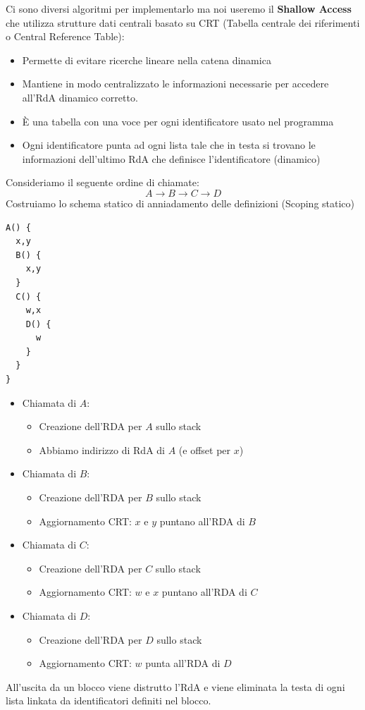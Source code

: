 \documentclass[a4paper]{article}
\begin{document}
Ci sono diversi algoritmi per implementarlo ma noi useremo
il \textbf{Shallow Access} che utilizza strutture dati centrali basato su CRT 
(Tabella centrale dei riferimenti o Central Reference Table):
\begin{itemize}
  \item Permette di evitare ricerche lineare nella catena dinamica
  \item Mantiene in modo centralizzato le informazioni necessarie per 
  accedere all'RdA dinamico corretto.
  \item È una tabella con una voce per ogni identificatore usato nel programma
  \item Ogni identificatore punta ad ogni lista tale che in testa 
  si trovano le informazioni dell'ultimo RdA che definisce l'identificatore (dinamico)
\end{itemize}

\begin{Example}{}{}
Consideriamo il seguente ordine di chiamate:
\[
  A \to B \to C \to D
\]  
Costruiamo lo schema statico di anniadamento delle definizioni (Scoping statico)
\begin{lstlisting}
A() { 
  x,y
  B() {
    x,y
  }
  C() {
    w,x
    D() {
      w
    }
  }
}
\end{lstlisting}
\noindent
\begin{itemize}
  \item Chiamata di $A$:
  \begin{itemize}
    \item Creazione dell'RDA per $A$ sullo stack
    \item Abbiamo indirizzo di RdA di $A$ (e offset per $x$)
  \end{itemize}
  \item Chiamata di $B$: 
  \begin{itemize}
    \item Creazione dell'RDA per $B$ sullo stack
    \item Aggiornamento CRT: $x$ e $y$ puntano all'RDA di $B$
  \end{itemize}
  \item Chiamata di $C$:
  \begin{itemize}
    \item Creazione dell'RDA per $C$ sullo stack
    \item Aggiornamento CRT: $w$ e $x$ puntano all'RDA di $C$
  \end{itemize}
  \item Chiamata di $D$: 
  \begin{itemize}
    \item Creazione dell'RDA per $D$ sullo stack
    \item Aggiornamento CRT: $w$ punta all'RDA di $D$
  \end{itemize}
\end{itemize}
All'uscita da un blocco viene distrutto l'RdA e viene eliminata la testa
di ogni lista linkata da identificatori definiti nel blocco.
\end{Example}
\end{document}
